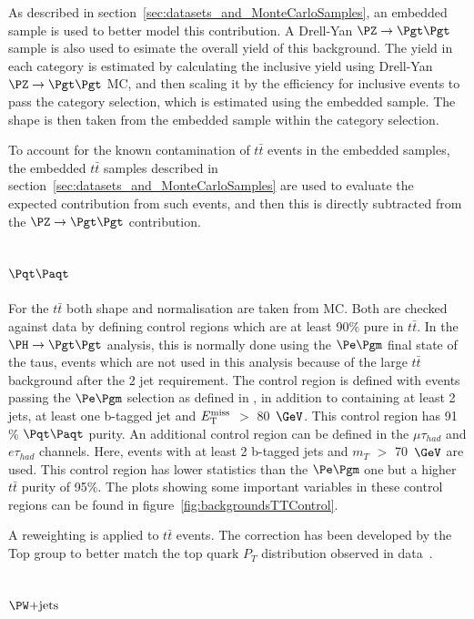 As described in section~\ref{sec:datasets_and_MonteCarloSamples}, an embedded
sample is used to better model this contribution. A Drell-Yan $\PZ \to\Pgt\Pgt$
sample is also used to esimate the overall yield of this background. 
The yield in each category is estimated by calculating the inclusive yield
using Drell-Yan $\PZ \to\Pgt\Pgt$ MC, and then scaling it by the efficiency for 
inclusive events to pass the category selection, which is estimated using the
embedded sample. The shape is then taken from the embedded sample within the
category selection.

To account for the known contamination of $t \bar{t}$ events in the embedded
samples, the embedded $t \bar{t}$ samples described in
section~\ref{sec:datasets_and_MonteCarloSamples} are used to evaluate the
expected contribution from such events, and then this is directly subtracted
from the $\PZ \to\Pgt\Pgt$ contribution.

\subsection{$\ttbar$}
\label{sec:backgroundEstimation_TT}

For the $t \bar{t}$ both shape and normalisation are taken from MC. Both are checked
against data by defining control regions which are at least 90$\%$ pure in
$t \bar{t}$. In the $\PH \to \Pgt\Pgt$ analysis, this is normally done using the
$\Pe\Pgm$ final state of the taus, events which are not used in this analysis
because of the large $t \bar{t}$ background after the 2 jet requirement. The control
region is defined with events passing the $\emu$ selection as defined in
\cite{HIG-13-004}, in addition to containing at least 2 jets, at least one b-tagged jet
and $E_{\mathrm{T}}^{\text{miss}}$ $>$ 80~$\GeV$. This control region has 91$\%$ $\ttbar$ purity.
An additional control region can be defined in the $\mu\tau_{had}$ and
$e\tau_{had}$ channels. Here, events with at least 2 b-tagged jets and $m_{T}$
$>$ 70~$\GeV$ are used. This control region has lower statistics than the $\emu$ one
but a higher $t \bar{t}$ purity of 95$\%$. The plots showing some important variables
in these control regions can be found in figure~\ref{fig:backgroundsTTControl}.

A reweighting is applied to $t \bar{t}$ events. The correction has been developed by the Top
group to better match the top quark $P_{T}$ distribution observed in data~\cite{TopPtReweighting}. 

\subsection{$\WJets$}
\label{sec:backgroundEstimation_WplusJets}

